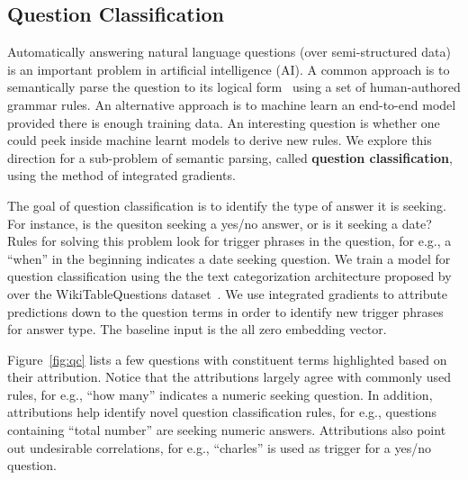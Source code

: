 \subsection{Question Classification}\label{sec:app-qc}
Automatically answering natural language questions (over
semi-structured data) is an important problem in artificial
intelligence (AI).  A common approach is to semantically parse the
question to its logical form~\cite{L16} using a set of
human-authored grammar rules. An alternative approach is to machine
learn an end-to-end model provided there is enough training data.
An interesting question is whether one could peek inside
machine learnt models to derive new rules.
We explore this direction for a sub-problem of
semantic parsing, called \textbf{question classification}, using the
method of integrated gradients.

The goal of question classification is to identify the
type of answer it is seeking. For instance, is
the quesiton seeking a yes/no answer, or is it seeking a date? Rules
for solving this problem look for trigger phrases in the question, for
e.g., a ``when'' in the beginning indicates a date seeking
question.
We train a model for question classification using the
the text categorization architecture
proposed by~\cite{K14} over the WikiTableQuestions dataset~\cite{PL15}.
We use integrated gradients to attribute
predictions down to the question terms in order to identify new
trigger phrases for answer type.
The baseline input is the all zero embedding vector.

Figure~\ref{fig:qc} lists a few questions with constituent terms
highlighted based on their attribution.  Notice that the attributions
largely agree with commonly used rules, for e.g., ``how many''
indicates a numeric seeking question. In addition, attributions
help identify novel question classification rules, for e.g.,
questions containing ``total number'' are seeking numeric answers.
Attributions also point out undesirable correlations, for e.g.,
``charles'' is used as trigger for a yes/no question.

